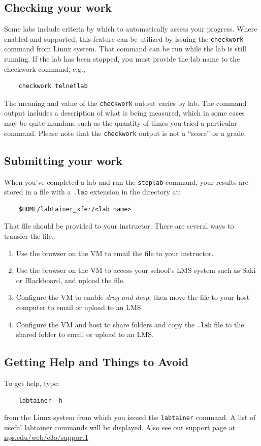 \documentclass[12pt]{article}
\begin{document}
\subsection{Checking your work}
Some labs include criteria by which to automatically assess your progress.
Where enabled and supported, this feature can be utilized by issuing the {\tt checkwork} command from Linux system.
That command can be run while the lab is still running.  If the lab has been stopped, you must provide the lab name to
the checkwork command, e.g.,
\begin{verbatim}
    checkwork telnetlab
\end{verbatim}
The meaning and value of the {\tt checkwork} output varies by lab.   The command output includes a description of what is being measured,  
which in some cases may be quite mundane such as the quantity of times you tried a particular command.
Please note that the {\tt checkwork} output is not a ``score'' or a grade.  

\subsection{Submitting your work}
When you've completed a lab and run the {\tt stoplab} command, your results are stored in a file with a {\tt .lab} extension
in the directory at:
\begin{verbatim}
    $HOME/labtainer_xfer/<lab name>
\end{verbatim}
\noindent That file should be provided to your instructor.  There are several ways to transfer the file.
\begin{enumerate}
\item Use the browser on the VM to email the file to your instructor.
\item Use the browser on the VM to access your school's LMS system such as Saki or Blackboard, and upload the file.
\item Configure the VM to enable \textit{drag and drop}, then move the file to your host computer to email or upload to an LMS.
\item Configure the VM and host to share folders and copy the {\tt .lab} file to the shared folder to email or upload to an LMS.
\end{enumerate}

\subsection{Getting Help and Things to Avoid}
To get help, type:
\begin{verbatim}
    labtainer -h
\end{verbatim}
\noindent from the Linux system from which you issued the {\tt labtainer} command. A list of useful labtainer commands will be displayed.
Also see our support page at \url{nps.edu/web/c3o/support1}
\end{document}
